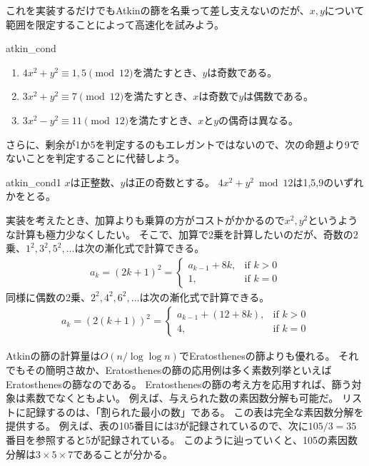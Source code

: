 これを実装するだけでもAtkinの篩を名乗って差し支えないのだが、$x,y$について範囲を限定することによって高速化を試みよう。

\begin{Prop}{}{atkin_cond}\;
\begin{enumerate}
 \item $4x^2+y^2 \equiv 1,5 \pmod{12}$を満たすとき、$y$は奇数である。
 \item $3x^2+y^2 \equiv 7 \pmod{12}$を満たすとき、$x$は奇数で$y$は偶数である。
 \item $3x^2-y^2 \equiv 11 \pmod{12}$を満たすとき、$x$と$y$の偶奇は異なる。
\end{enumerate}
\end{Prop}

さらに、剰余が1か5を判定するのもエレガントではないので、次の命題より9でないことを判定することに代替しよう。

\begin{Prop}{}{atkin_cond1}
$x$は正整数、$y$は正の奇数とする。
$4x^2+y^2 \bmod{12}$は1,5,9のいずれかをとる。
\end{Prop}

実装を考えたとき、加算よりも乗算の方がコストがかかるので$x^2,y^2$というような計算も極力少なくしたい。
そこで、加算で2乗を計算したいのだが、奇数の2乗、$1^2,3^2,5^2,\ldots$は次の漸化式で計算できる。
\begin{align*}
a_{k} = (2k+1)^2 =
\begin{cases}
a_{k-1} + 8k, &\mbox{if } k > 0\\
1, &\mbox{if } k = 0
\end{cases}
\end{align*}
同様に偶数の2乗、$2^2,4^2,6^2,\ldots$は次の漸化式で計算できる。
\begin{align*}
a_k = (2(k+1))^2 =
\begin{cases}
a_{k-1} + (12 + 8k), &\mbox{if } k > 0\\
4, &\mbox{if } k = 0
\end{cases}
\end{align*}


Atkinの篩の計算量は$O(n/\log{\log{n}})$でEratosthenesの篩よりも優れる。
それでもその簡明さ故か、Eratosthenesの篩の応用例は多く素数列挙といえばEratosthenesの篩なのである。
Eratosthenesの篩の考え方を応用すれば、篩う対象は素数でなくともよい。
例えば、与えられた数の素因数分解も可能だ。
リストに記録するのは、「割られた最小の数」である。
この表は完全な素因数分解を提供する。
例えば、表の105番目には3が記録されているので、次に$105/3=35$番目を参照すると5が記録されている。
このように辿っていくと、105の素因数分解は$3\times5\times7$であることが分かる。


